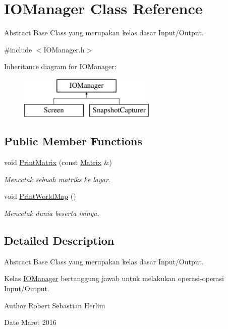 \hypertarget{class_i_o_manager}{}\section{I\+O\+Manager Class Reference}
\label{class_i_o_manager}


Abstract Base Class yang merupakan kelas dasar Input/\+Output.  




{\ttfamily \#include $<$I\+O\+Manager.\+h$>$}

Inheritance diagram for I\+O\+Manager\+:\begin{figure}[H]
\begin{center}
\leavevmode
\includegraphics[height=2.000000cm]{class_i_o_manager}
\end{center}
\end{figure}
\subsection*{Public Member Functions}
\begin{DoxyCompactItemize}
\item 
void \hyperlink{class_i_o_manager_a996088d522ece770be55b53ec6fbde24}{Print\+Matrix} (const \hyperlink{class_matrix}{Matrix} \&)
\begin{DoxyCompactList}\small\item\em Mencetak sebuah matriks ke layar. \end{DoxyCompactList}\item 
void \hyperlink{class_i_o_manager_acef10db057340616aba5d0bb13142228}{Print\+World\+Map} ()
\begin{DoxyCompactList}\small\item\em Mencetak dunia beserta isinya. \end{DoxyCompactList}\end{DoxyCompactItemize}


\subsection{Detailed Description}
Abstract Base Class yang merupakan kelas dasar Input/\+Output. 

Kelas \hyperlink{class_i_o_manager}{I\+O\+Manager} bertanggung jawab untuk melakukan operasi-\/operasi Input/\+Output. \begin{DoxyAuthor}{Author}
Robert Sebastian Herlim 
\end{DoxyAuthor}
\begin{DoxyDate}{Date}
Maret 2016 
\end{DoxyDate}


